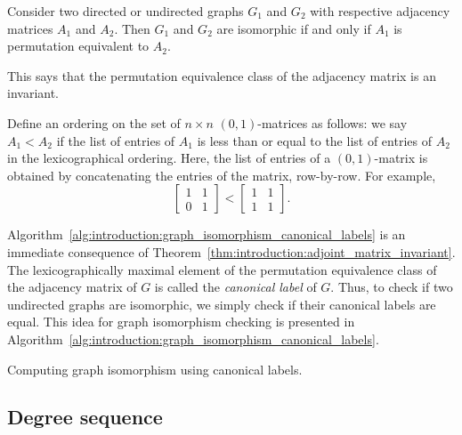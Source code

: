 \begin{theorem}
\label{thm:introduction:adjoint_matrix_invariant}
Consider two directed or undirected graphs $G_1$ and $G_2$ with
respective adjacency matrices $A_1$ and $A_2$. Then $G_1$ and $G_2$
are isomorphic if and only if $A_1$ is permutation equivalent to
$A_2$.
\end{theorem}

This says that the permutation equivalence class of the adjacency
matrix is an invariant.

Define an ordering on the set of $n \times n$ $(0, 1)$-matrices as
follows: we say $A_1 < A_2$ if the list of entries of $A_1$ is less
than or equal to the list of entries of $A_2$ in the lexicographical
ordering. Here, the list of entries of a $(0, 1)$-matrix is obtained
by concatenating the entries of the matrix, row-by-row. For example,
\[
\begin{bmatrix}
1 & 1 \\
0 & 1
\end{bmatrix}
<
\begin{bmatrix}
1 & 1 \\
1 & 1
\end{bmatrix}.
\]

Algorithm~\ref{alg:introduction:graph_isomorphism_canonical_labels} is
an immediate consequence of
Theorem~\ref{thm:introduction:adjoint_matrix_invariant}. The
lexicographically maximal element of the permutation equivalence class
of the adjacency matrix of $G$ is called the
\emph{canonical label} of $G$. Thus, to check
if two undirected graphs are isomorphic, we simply check if their
canonical labels are equal. This idea for graph isomorphism checking
is presented in
Algorithm~\ref{alg:introduction:graph_isomorphism_canonical_labels}.

\begin{algorithm}[!htbp]

\caption{Computing graph isomorphism using canonical labels.}
\label{alg:introduction:graph_isomorphism_canonical_labels}
\end{algorithm}



\subsection{Degree sequence}

